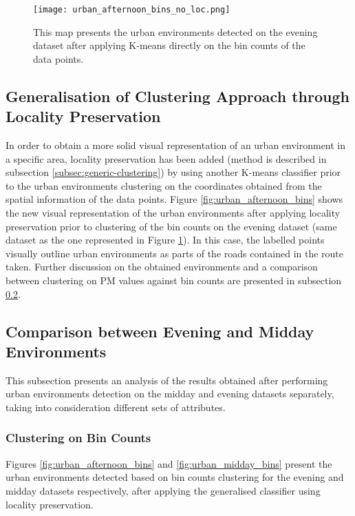 \documentclass[bsc,frontabs,twoside,singlespacing, parskip,deptreport]{infthesis}     %
\begin{document}
\begin{figure}[h!]
  \center
  \texttt{[image: urban\_afternoon\_bins\_no\_loc.png]}
  \caption{This map presents the urban environments detected on the evening dataset after applying K-means directly on the bin counts of the data points.}
  \label{fig:urban_afternoon_bins_no_loc.png}
\end{figure}


\subsection{Generalisation of Clustering Approach through Locality Preservation}
\label{subsec:locality-preservation-results}

In order to obtain a more solid visual representation of an urban environment in a specific area, locality preservation has been added (method is described in subsection \ref{subsec:generic-clustering}) by using another K-means classifier prior to the urban environments clustering on the coordinates obtained from the spatial information of the data points. Figure \ref{fig:urban_afternoon_bins} shows the new visual representation of the urban environments after applying locality preservation prior to clustering of the bin counts on the evening dataset (same dataset as the one represented in Figure \ref{fig:urban_afternoon_bins_no_loc.png}). In this case, the labelled points visually outline urban environments as parts of the roads contained in the route taken. Further discussion on the obtained environments and a comparison between clustering on PM values against bin counts are presented in subsection \ref{subsec:afternoon-midday-results}.


\subsection{Comparison between Evening and Midday Environments}
\label{subsec:afternoon-midday-results}

This subsection presents an analysis of the results obtained after performing urban environments detection on the midday and evening datasets separately, taking into consideration different sets of attributes.

\subsubsection*{Clustering on Bin Counts}

Figures \ref{fig:urban_afternoon_bins} and \ref{fig:urban_midday_bins} present the urban environments detected based on bin counts clustering for the evening and midday datasets respectively, after applying the generalised classifier using locality preservation.
\end{document}

